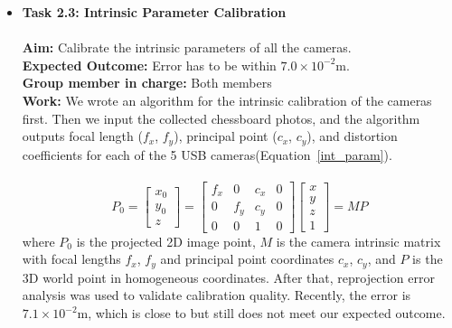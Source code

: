 \documentclass[11pt]{article}
\begin{document}
\begin{itemize}
            
            \item \textbf{Task 2.3: Intrinsic Parameter Calibration}\\\\
            \textbf{Aim:} Calibrate the intrinsic parameters of all the cameras.\\
            \textbf{Expected Outcome:} Error has to be within $7.0\times10^{-2}$m.\\
            \textbf{Group member in charge:} Both members\\
            \textbf{Work:} We wrote an algorithm for the intrinsic calibration of the cameras first. Then we input the collected chessboard photos, and the algorithm outputs focal length ($f_x$, $f_y$), principal point ($c_x$, $c_y$), and distortion coefficients for each of the 5 USB cameras(Equation~\ref{int_param}). \\\\
            \begin{equation}
            P_0
            = \begin{bmatrix}x_0 \\ y_0 \\ z\end{bmatrix}
            =
            \begin{bmatrix}
            f_x & 0 & c_x & 0 \\
            0 & f_y & c_y & 0 \\
            0 & 0 & 1 & 0
            \end{bmatrix}
            \begin{bmatrix}x \\ y \\ z \\ 1\end{bmatrix}
            = MP
            \label{int_param}
            \end{equation}
            where $P_0$ is the projected 2D image point, $M$ is the camera intrinsic matrix with focal lengths $f_x$, $f_y$ and principal point coordinates $c_x$, $c_y$, and $P$ is the 3D world point in homogeneous coordinates.
            After that, reprojection error analysis was used to validate calibration quality. Recently, the error is $7.1\times10^{-2}$m, which is close to but still does not meet our expected outcome.\\\\
            

\end{itemize}
\end{document}
